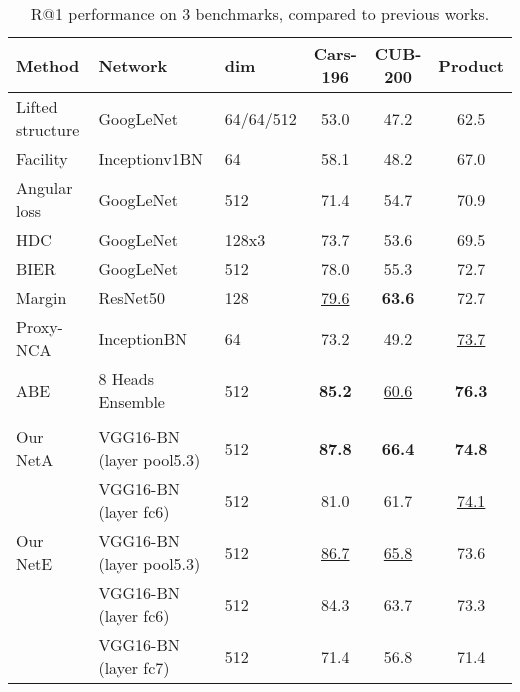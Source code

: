 \documentclass[10pt,twocolumn,letterpaper]{article}
\begin{document}
\setlength{\tabcolsep}{5.1pt}
\begin{center}
\begin{table*}[]
\begin{center}
\label{table:benchmarks1}
\centering
\caption{R@1 performance on 3 benchmarks, compared to previous works. }

 \vspace{5pt}
 
 
\begin{tabular}{| l | ll | ccc |}
\hline
Method  & Network & dim & Cars-196 & CUB-200 & Product   \\

\hline
\hline
Lifted structure \cite{oh2016deep}  & GoogLeNet & 64/64/512  & 53.0  & 47.2 & 62.5  \\
Facility \cite{songCVPR17}  & Inceptionv1BN & 64 &  58.1 & 48.2 & 67.0  \\
Angular loss \cite{wang2017deep}  & GoogLeNet & 512 &  71.4 & 54.7 & 70.9  \\
HDC \cite{yuan2016hard}  & GoogLeNet & 128x3 &  73.7 & 53.6 & 69.5  \\
BIER \cite{opitz2017bier}  & GoogLeNet & 512 &  78.0 & 55.3 & 72.7  \\
Margin \cite{wu2017sampling}  & ResNet50 & 128 &  \underline{79.6} & \textbf{63.6} & 72.7  \\
Proxy-NCA \cite{movshovitz2017no}  & InceptionBN & 64 &  73.2 & 49.2 & \underline{73.7}  \\
  
ABE \cite{kim2018attention}  &  8 Heads Ensemble & 512 &  \textbf{85.2} & \underline{60.6} & \textbf{76.3}  \\

\hline

& & & & & 
 \vspace{-5pt}
 
\\

 
Our NetA     & VGG16-BN (layer pool5.3) & 512 &  \textbf{87.8} & \textbf{66.4} & \textbf{74.8}  \\
 & VGG16-BN (layer fc6) & 512 &  81.0 & 61.7 & \underline{74.1}   \\
     
 Our NetE    & VGG16-BN (layer pool5.3) & 512 &  \underline{86.7} & \underline{65.8} & 73.6  \\ 
     & VGG16-BN (layer fc6) & 512 &  84.3 & 63.7 & 73.3   \\
  & VGG16-BN (layer fc7) & 512 &  71.4 & 56.8 & 71.4   \\

\hline

\end{tabular}


\label{table:benchmarks1}
\end{center}
\end{table*}
\end{center}
\end{document}
